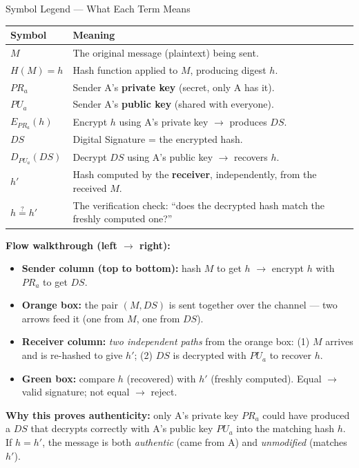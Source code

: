 \documentclass[12pt,a4paper]{article}
\begin{document}
\begin{keybox}{Symbol Legend --- What Each Term Means}
\begin{tabularx}{\textwidth}{@{}l X@{}}
\toprule
\textbf{Symbol} & \textbf{Meaning} \\
\midrule
$M$ & The original message (plaintext) being sent. \\
$H(M) = h$ & Hash function applied to $M$, producing digest $h$. \\
$PR_a$ & Sender A's \textbf{private key} (secret, only A has it). \\
$PU_a$ & Sender A's \textbf{public key} (shared with everyone). \\
$E_{PR_a}(h)$ & Encrypt $h$ using A's private key $\to$ produces $DS$. \\
$DS$ & Digital Signature = the encrypted hash. \\
$D_{PU_a}(DS)$ & Decrypt $DS$ using A's public key $\to$ recovers $h$. \\
$h'$ & Hash computed by the \textbf{receiver}, independently, from the received $M$. \\
$h \stackrel{?}{=} h'$ & The verification check: ``does the decrypted hash match the freshly computed one?'' \\
\bottomrule
\end{tabularx}

\vspace{6pt}
\textbf{Flow walkthrough (left $\to$ right):}
\begin{itemize}[noitemsep]
  \item \textbf{Sender column (top to bottom):} hash $M$ to get $h$ $\to$ encrypt $h$ with $PR_a$ to get $DS$.
  \item \textbf{Orange box:} the pair $(M, DS)$ is sent together over the channel --- two arrows feed it (one from $M$, one from $DS$).
  \item \textbf{Receiver column:} \emph{two independent paths} from the orange box: (1) $M$ arrives and is re-hashed to give $h'$; (2) $DS$ is decrypted with $PU_a$ to recover $h$.
  \item \textbf{Green box:} compare $h$ (recovered) with $h'$ (freshly computed). Equal $\to$ valid signature; not equal $\to$ reject.
\end{itemize}

\vspace{4pt}
\textbf{Why this proves authenticity:} only A's private key $PR_a$ could have produced a $DS$ that decrypts correctly with A's public key $PU_a$ into the matching hash $h$. If $h = h'$, the message is both \emph{authentic} (came from A) and \emph{unmodified} (matches $h'$).
\end{keybox}
\end{document}
